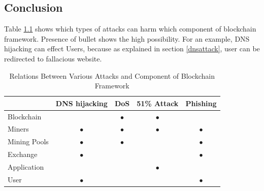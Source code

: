 \documentclass[a4paper,twoside,12pt]{report}
\begin{document}
\begin{spacing}{1.5}
\chapter{Conclusion}
Table \ref{tab:relationattackancomponent} shows which types of attacks can harm which component of blockchain framework. Presence of bullet shows the high possibility. For an example, DNS hijacking can effect Users, because as explained in section \ref{dnsattack}, user can be redirected to fallacious website.   
\label{chaper4}
\begin{table}[h!]
  \begin{center}
    \caption{Relations Between Various Attacks and Component of Blockchain Framework}
    \label{tab:relationattackancomponent}
    \begin{tabular}{l|c|c|c|c} %
      \toprule
      \textbf{} & \textbf{DNS hijacking} & \textbf{DoS} & \textbf{51\% Attack} &\textbf{Phishing}\\
		\hline
      Blockchain   &           & $\bullet$ & $\bullet$ &\\
		\hline      
      Miners       & $\bullet$ & $\bullet$ & $\bullet$ & $\bullet$ \\
		\hline      
      Mining Pools & $\bullet$ & $\bullet$ &           & $\bullet$ \\
		\hline      
      Exchange     & $\bullet$ &           &           & $\bullet$ \\
		\hline
	  Application  &           &           & $\bullet$ &           \\
		\hline      
      User         & $\bullet$ &           &           & $\bullet$ \\
      \bottomrule
    \end{tabular}
  \end{center}
\end{table}  \end{spacing}



\end{document}
